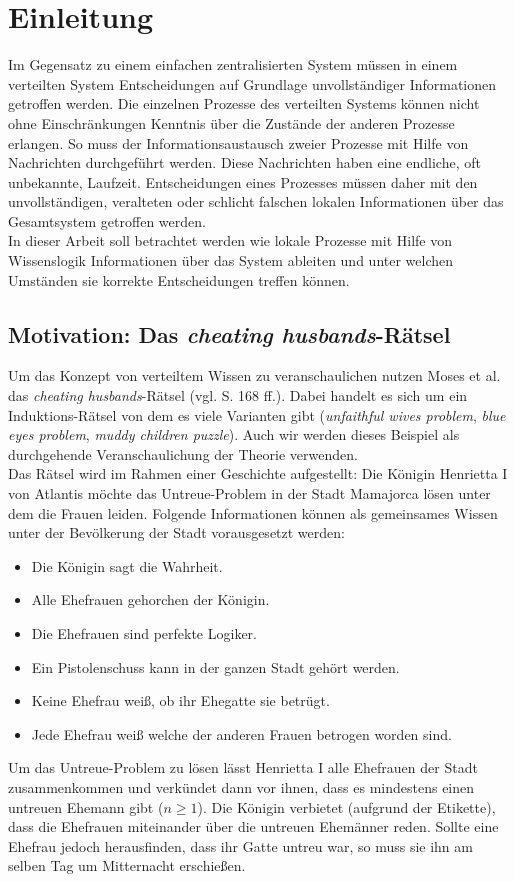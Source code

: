 \section{Einleitung}
Im Gegensatz zu einem einfachen zentralisierten System müssen in einem verteilten System Entscheidungen auf Grundlage unvollständiger Informationen getroffen werden.
Die einzelnen Prozesse des verteilten Systems können nicht ohne Einschränkungen Kenntnis über die Zustände der anderen Prozesse erlangen.
So muss der Informationsaustausch zweier Prozesse mit Hilfe von Nachrichten durchgeführt werden. Diese Nachrichten haben eine endliche, oft unbekannte, Laufzeit.
Entscheidungen eines Prozesses müssen daher mit den unvollständigen, veralteten oder schlicht falschen lokalen Informationen über das Gesamtsystem getroffen werden.\\
In dieser Arbeit soll betrachtet werden wie lokale Prozesse mit Hilfe von Wissenslogik Informationen über das System ableiten und unter welchen Umständen sie korrekte Entscheidungen treffen können.

\subsection{Motivation: Das \textit{cheating husbands}-Rätsel}
Um das Konzept von verteiltem Wissen zu veranschaulichen nutzen Moses et al. \cite{moses1986cheating} das \textit{cheating husbands}-Rätsel (vgl. \cite{moses1986cheating} S. 168 ff.).
Dabei handelt es sich um ein Induktions-Rätsel von dem es viele Varianten gibt (\textit{unfaithful wives problem}, \textit{blue eyes problem}, \textit{muddy children puzzle}). Auch wir werden dieses Beispiel als durchgehende Veranschaulichung der Theorie verwenden.\\
Das Rätsel wird im Rahmen einer Geschichte aufgestellt: Die Königin Henrietta I von Atlantis möchte das Untreue-Problem in der Stadt Mamajorca lösen unter dem die Frauen leiden.
Folgende Informationen können als gemeinsames Wissen unter der Bevölkerung der Stadt vorausgesetzt werden:
\begin{itemize}
	\item Die Königin sagt die Wahrheit.
	\item Alle Ehefrauen gehorchen der Königin.
	\item Die Ehefrauen sind perfekte Logiker.
	\item Ein Pistolenschuss kann in der ganzen Stadt gehört werden.
	\item Keine Ehefrau weiß, ob ihr Ehegatte sie betrügt.
	\item Jede Ehefrau weiß welche der anderen Frauen betrogen worden sind.
\end{itemize}
Um das Untreue-Problem zu lösen lässt Henrietta I alle Ehefrauen der Stadt zusammenkommen und verkündet dann vor ihnen, dass es mindestens einen untreuen Ehemann gibt ($n \ge 1$).
Die Königin verbietet (aufgrund der Etikette), dass die Ehefrauen miteinander über die untreuen Ehemänner reden.
Sollte eine Ehefrau jedoch herausfinden, dass ihr Gatte untreu war, so muss sie ihn am selben Tag um Mitternacht erschießen.\medskip

